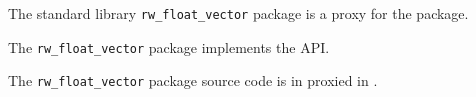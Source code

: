 
The standard library {\tt rw\_float\_vector} package is a proxy for the 
 package.

The {\tt rw\_float\_vector} package implements the  API.

The {\tt rw\_float\_vector} package source code is in proxied in .



